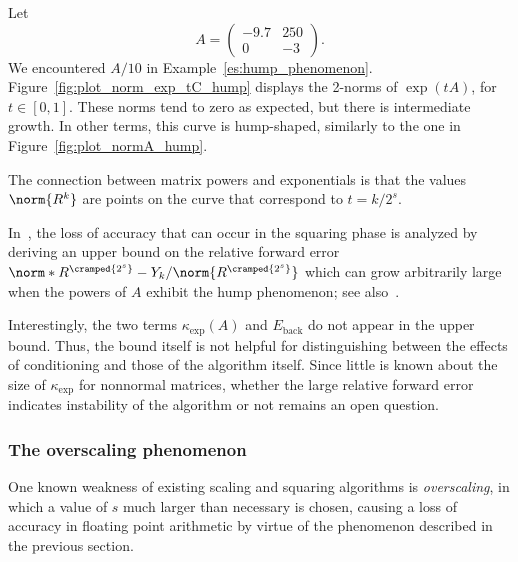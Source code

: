 \begin{esempio}
	Let
	\begin{equation}\label{eqn:A_exp_tA_hump}
		A = \begin{pmatrix}
			-9.7 & 250\\ 0 & -3
		\end{pmatrix}.
	\end{equation}
	We encountered $A/10$ in Example~\vref{es:hump_phenomenon}. Figure~\vref{fig:plot_norm_exp_tC_hump} displays the 2-norms of $\exp(tA)$, for $t\in[0,1]$. These norms tend to zero as expected, but there is intermediate growth. In other terms, this curve is hump-shaped, similarly to the one in Figure~\ref{fig:plot_normA_hump}.
	
	The connection between matrix powers and exponentials is that the values $\norm{R^k}$ are points on the curve that correspond to $t=k/2^s$.
\end{esempio}

In~\cite[§~10.3]{higham:matfun_book}, the loss of accuracy that can occur in the squaring phase is analyzed by deriving an upper bound on the relative forward error $\norm*{R^{\cramped{2^s}}-Y_k}/\norm{R^{\cramped{2^s}}}$ which can grow arbitrarily large when the powers of $A$ exhibit the hump phenomenon; see also~\cite[Thm.~10.21]{higham:matfun_book}. 

Interestingly, the two terms $\kappa_{\exp}(A)$ and $E_{\text{back}}$ do not appear in the upper bound. Thus, the bound itself is not helpful for distinguishing between the effects of conditioning and those of the algorithm itself. 
Since little is known about the size of $\kappa_{\exp}$ for nonnormal matrices, whether the large relative forward error indicates instability of the algorithm or not remains an open question.  
\medskip 

\subsubsection{The overscaling phenomenon}
One known weakness of existing scaling and squaring algorithms is \emph{overscaling}, in which a value of $s$ much larger than necessary is chosen, causing a loss of accuracy in floating point arithmetic by virtue of the phenomenon described in the previous section. 

